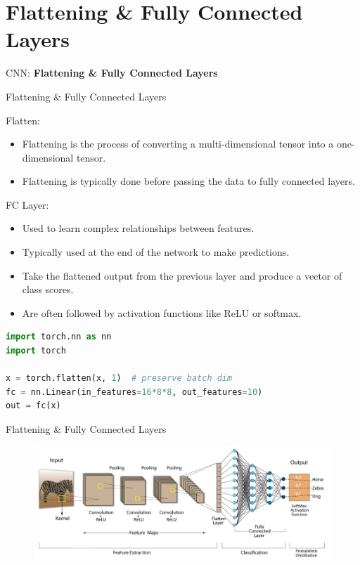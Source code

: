 \section{Flattening & Fully Connected Layers}
\begin{frame}{}
    \LARGE CNN: \textbf{Flattening & Fully Connected Layers}
\end{frame}

\begin{frame}[fragile]{Flattening & Fully Connected Layers}
\begin{block}{Flatten:}
    \begin{itemize}
        \item Flattening is the process of converting a multi-dimensional tensor into a one-dimensional tensor.
        \item Flattening is typically done before passing the data to fully connected layers.
    \end{itemize}
\end{block}

\begin{block}{FC Layer:}
    \begin{itemize}
        \item Used to learn complex relationships between features.
        \item Typically used at the end of the network to make predictions.
        \item Take the flattened output from the previous layer and produce a vector of class scores.
        \item Are often followed by activation functions like ReLU or softmax.
    \end{itemize}
\end{block}

\begin{lstlisting}[language=Python, caption={Code snippet (PyTorch)}, basicstyle=\ttfamily\footnotesize]
import torch.nn as nn
import torch

x = torch.flatten(x, 1)  # preserve batch dim
fc = nn.Linear(in_features=16*8*8, out_features=10)
out = fc(x)
\end{lstlisting}
\end{frame}  

\begin{frame}{Flattening & Fully Connected Layers}
\begin{figure}
\centering
\includegraphics[width=1.0\textwidth,height=0.9\textheight,keepaspectratio]{images/cnn/cnn-fully-connected.jpeg}
\end{figure}
    
\end{frame}